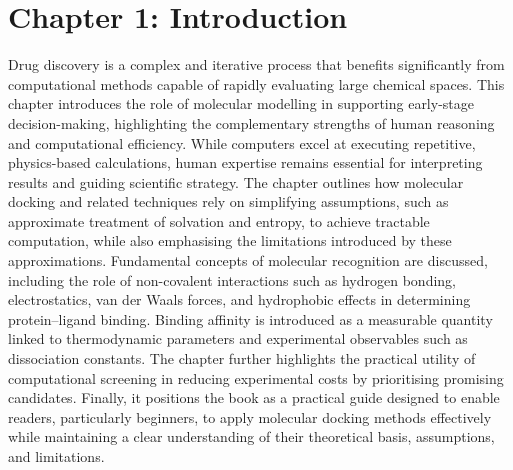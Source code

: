 \documentclass[12pt,a4paper]{article}
\begin{document}
\section*{Chapter 1: Introduction}
Drug discovery is a complex and iterative process that benefits significantly from computational methods capable of rapidly evaluating large chemical spaces. This chapter introduces the role of molecular modelling in supporting early-stage decision-making, highlighting the complementary strengths of human reasoning and computational efficiency. While computers excel at executing repetitive, physics-based calculations, human expertise remains essential for interpreting results and guiding scientific strategy. The chapter outlines how molecular docking and related techniques rely on simplifying assumptions, such as approximate treatment of solvation and entropy, to achieve tractable computation, while also emphasising the limitations introduced by these approximations. Fundamental concepts of molecular recognition are discussed, including the role of non-covalent interactions such as hydrogen bonding, electrostatics, van der Waals forces, and hydrophobic effects in determining protein–ligand binding. Binding affinity is introduced as a measurable quantity linked to thermodynamic parameters and experimental observables such as dissociation constants. The chapter further highlights the practical utility of computational screening in reducing experimental costs by prioritising promising candidates. Finally, it positions the book as a practical guide designed to enable readers, particularly beginners, to apply molecular docking methods effectively while maintaining a clear understanding of their theoretical basis, assumptions, and limitations.
\end{document}
